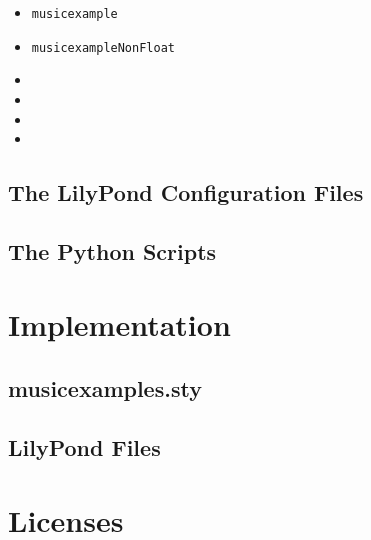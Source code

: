 \documentclass{OLLbook}
\begin{document}
\begin{itemize}
\item \texttt{musicexample}
\item \texttt{musicexampleNonFloat}
\item {}
\item {}
\item {}
\item {}
\end{itemize}

\section{The LilyPond Configuration Files}
\label{sec:lilypond-configuration}

\section{The Python Scripts}

\chapter{Implementation}

\section{musicexamples.sty}

\section{LilyPond Files}

\chapter{Licenses}

\end{document}
